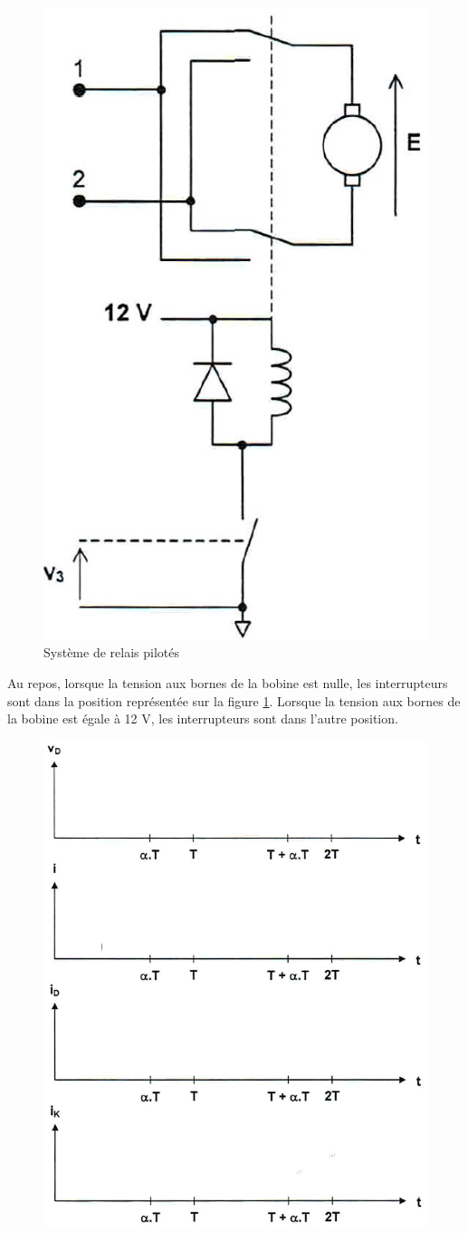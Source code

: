 \begin{figure}[ht!]
\begin{center}
 \includegraphics[width=.4\linewidth]{img/schema_elec2}
\end{center}
\caption{\label{schema_elec2}Système de relais pilotés}
\end{figure}

Au repos, lorsque la tension aux bornes de la bobine est nulle, les interrupteurs sont dans la position représentée sur la figure \ref{schema_elec2}. Lorsque la tension aux bornes de la bobine est égale à 12 V, les interrupteurs sont dans l'autre position.


\begin{figure}[ht!]
\begin{center}
 \includegraphics[width=.8\linewidth]{img/doc_reponse}
\end{center}
\end{figure}

